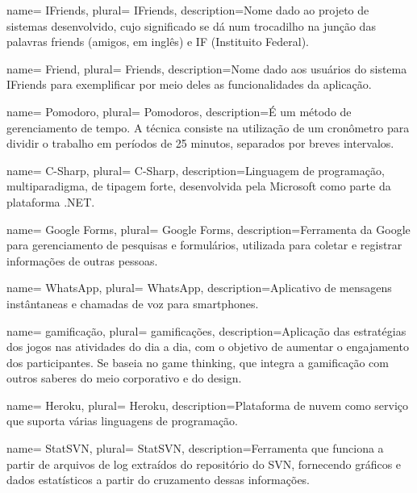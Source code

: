  {
    name= IFriends,
    plural= {IFriends},
    description={Nome dado ao projeto de sistemas desenvolvido, cujo significado se dá num trocadilho na junção das palavras friends (amigos, em inglês) e IF (Instituito Federal).}
}

 {
    name= Friend,
    plural= {Friends},
    description={Nome dado aos usuários do sistema IFriends para exemplificar por meio deles as funcionalidades da aplicação.}
}

 {
    name= Pomodoro,
    plural= {Pomodoros},
    description={É um método de gerenciamento de tempo. A técnica consiste na utilização de um cronômetro para dividir o trabalho em períodos de 25 minutos, separados por breves intervalos.}
}

 {
    name= C-Sharp,
    plural= {C-Sharp},
    description={Linguagem de programação, multiparadigma, de tipagem forte, desenvolvida pela Microsoft como parte da plataforma .NET. }
}

 {
    name= Google Forms,
    plural= {Google Forms},
    description={Ferramenta da Google para gerenciamento de pesquisas e formulários, utilizada para coletar e registrar informações de outras pessoas. }
}

 {
    name= WhatsApp,
    plural= {WhatsApp},
    description={Aplicativo de mensagens instântaneas e chamadas de voz para smartphones. }
}

 {
    name= gamificação,
    plural= {gamificações},
    description={Aplicação das estratégias dos jogos nas atividades do dia a dia, com o objetivo de aumentar o engajamento dos participantes. Se baseia no game thinking, que integra a gamificação com outros saberes do meio corporativo e do design. }
}

 {
    name= Heroku,
    plural= {Heroku},
    description={Plataforma de nuvem como serviço que suporta várias linguagens de programação.}
}

 {
    name= StatSVN,
    plural= {StatSVN},
    description={Ferramenta que funciona a partir de arquivos de log extraídos do
    repositório do SVN, fornecendo gráficos e dados estatísticos a
    partir do cruzamento dessas informações.}
}


